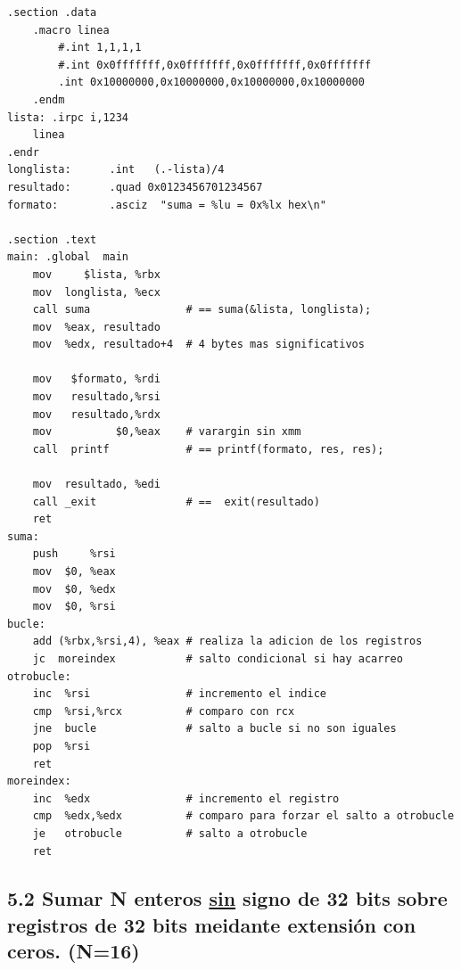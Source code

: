 	\lstset{language=[x64]Assembler}
	\begin{lstlisting}[frame=single]  
.section .data
	.macro linea
		#.int 1,1,1,1
		#.int 0x0fffffff,0x0fffffff,0x0fffffff,0x0fffffff
		.int 0x10000000,0x10000000,0x10000000,0x10000000
	.endm
lista: .irpc i,1234
	linea
.endr
longlista:      .int   (.-lista)/4
resultado:      .quad 0x0123456701234567
formato:        .asciz  "suma = %lu = 0x%lx hex\n"

.section .text
main: .global  main
	mov     $lista, %rbx
	mov  longlista, %ecx
	call suma               # == suma(&lista, longlista);
	mov  %eax, resultado
	mov  %edx, resultado+4  # 4 bytes mas significativos
	
	mov   $formato, %rdi
	mov   resultado,%rsi
	mov   resultado,%rdx
	mov          $0,%eax    # varargin sin xmm
	call  printf            # == printf(formato, res, res);
	
	mov  resultado, %edi
	call _exit              # ==  exit(resultado)
	ret
suma:
	push     %rsi
	mov  $0, %eax
	mov  $0, %edx
	mov  $0, %rsi
bucle:
	add (%rbx,%rsi,4), %eax # realiza la adicion de los registros
	jc  moreindex           # salto condicional si hay acarreo
otrobucle:
	inc  %rsi               # incremento el indice
	cmp  %rsi,%rcx          # comparo con rcx
	jne  bucle              # salto a bucle si no son iguales
	pop  %rsi
	ret
moreindex:
	inc  %edx               # incremento el registro
	cmp  %edx,%edx          # comparo para forzar el salto a otrobucle
	je   otrobucle          # salto a otrobucle
	ret
	\end{lstlisting}
	
		
	\subsection{5.2 Sumar N enteros \underline{sin} signo de 32 bits sobre registros de 32 bits meidante extensión con ceros. (N=16)}
	
